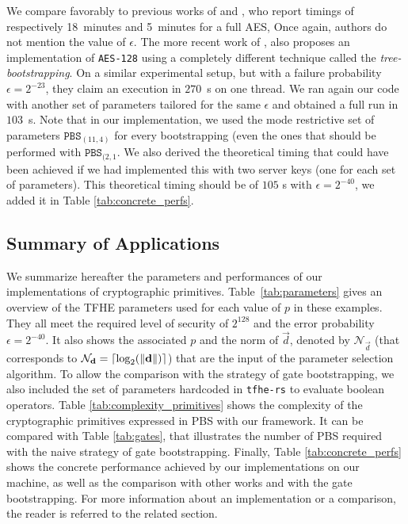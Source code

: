 We compare favorably to previous works of \cite{C:GenHalSma12} and \cite{PKC:CorLepTib14}, who report timings of respectively 18~minutes and 5~minutes for a full AES, Once again, authors do not mention the value of $\epsilon$. The more recent work of \cite{DBLP:conf/wahc/TramaCBS23}, also proposes an implementation of \texttt{AES-128} using a completely different technique called the \emph{tree-bootstrapping}. On a similar experimental setup, but with a failure probability $\epsilon=2^{-23}$, they claim an execution in $270$~s on one thread. We ran again our code with another set of parameters tailored for the same $\epsilon$ and obtained a full run in $103$~s.  Note that in our implementation, we used the mode restrictive set of parameters $\texttt{PBS}_{(11, 4)}$ for every bootstrapping (even the ones that should be performed with $\texttt{PBS}_{(2, 1}$. We also derived the theoretical timing that could have been achieved if we had implemented this with two server keys (one for each set of parameters). This theoretical timing should be of $105$ s with $\epsilon=2^{-40}$, we added it in Table \ref{tab:concrete_perfs}.


\subsection{Summary of Applications}
\label{sec:tables_perfs}


We summarize hereafter the parameters and performances of our implementations of cryptographic primitives. Table~\ref{tab:parameters} gives an overview of the TFHE parameters used for each value of $p$ in these examples. They all meet the required level of security of $2^{128}$ and the error probability $\epsilon=2^{-40}$. It also shows the associated $p$ and the norm of $\vec d$, denoted by $\mathcal{N}_{\vec d}$ (that corresponds to $\mathcal{N}_{\mathbf d} = \lceil \log_2(\lVert \mathbf d \rVert) \rceil$) that are the input of the parameter selection algorithm. To allow the comparison with the strategy of gate bootstrapping, we also included the set of parameters hardcoded in \texttt{tfhe-rs} to evaluate boolean operators. Table \ref{tab:complexity_primitives} shows the complexity of the cryptographic primitives expressed in PBS with our framework. It can be compared with Table \ref{tab:gates}, that illustrates the number of PBS required with the naive strategy of gate bootstrapping. Finally, Table \ref{tab:concrete_perfs} shows the concrete performance achieved by our implementations on our machine, as well as the comparison with other works and with the gate bootstrapping. For more information about an implementation or a comparison, the reader is referred to the related section.

